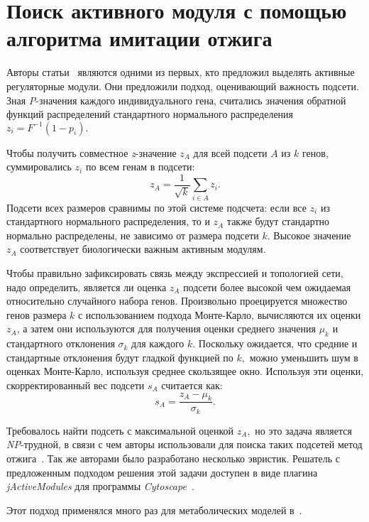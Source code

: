 \section{Поиск активного модуля с помощью алгоритма имитации отжига}

Авторы статьи~\cite{Ideker2002} являются одними из первых, кто предложил выделять
активные регуляторные модули.  Они предложили подход, оценивающий важность
подсети. Зная \emph{P}-значения каждого индивидуального гена, считались
значения обратной функций распределений стандартного нормального распределения
$z_i = F^{-1}(1 - p_i).$

Чтобы получить совместное \emph{z}-значение $z_A$ для всей подсети $A$ из $k$
генов, суммировались $z_i$ по всем генам в подсети:
\begin{equation}\label{eq:zA}
z_A = \frac{1}{\sqrt{k}}\sum_{i \in A} z_i.
\end{equation}
Подсети всех размеров сравнимы по этой системе подсчета: если все $z_i$ из
стандартного нормального распределения, то и $z_A$ также будут стандартно
нормально распределены, не зависимо от размера подсети $k$.  Высокое значение
$z_A$ соответствует биологически важным активным модулям.

Чтобы правильно зафиксировать связь между экспрессией и топологией сети,
надо определить, является ли оценка $z_A$ подсети более высокой чем ожидаемая
относительно случайного набора генов. Произвольно проецируется множество генов
размера $k$ с использованием подхода Монте-Карло, вычисляются их оценки $z_A$,
а затем они используются для получения оценки среднего значения $\mu_k$ и
стандартного отклонения $\sigma_k$ для каждого $k.$ Поскольку ожидается, что
средние и стандартные отклонения будут гладкой функцией по $k,$ можно уменьшить
шум в оценках Монте-Карло, используя среднее скользящее окно. Используя эти
оценки, скорректированный вес подсети $s_A$ считается как:
\[s_A = \frac{z_A - \mu_k}{\sigma_k}.\]

Требовалось найти подсеть с максимальной оценкой $z_A,$ но это задача является
\emph{NP}-трудной, в связи с чем авторы использовали для поиска таких подсетей
метод отжига~\cite{Kirkpatrick1983}. Так же авторами было разработано несколько
эвристик. Решатель с предложенным подходом решения этой задачи доступен в виде
плагина \emph{jActiveModules} для программы
\emph{Cytoscape}~\cite{Shannon2003}.

Этот подход применялся много раз для метаболических моделей
в~\cite{Patil2005,Mardinoglu2013,Mardinoglu2015}.





